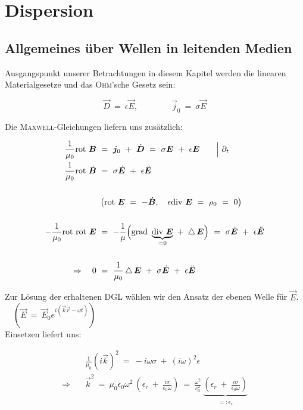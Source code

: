 \chapter{Dispersion}

\section{Allgemeines über Wellen in leitenden Medien}

Ausgangspunkt unserer Betrachtungen in diesem Kapitel werden die linearen Materialgesetze und das \textsc{Ohm}'sche Gesetz sein:

\begin{equation*}
\vec{D}  \ = \ \epsilon \vec{E}, \qquad\qquad\vec{j}_0  \ = \ \sigma\vec{E}
\end{equation*}

Die \textsc{Maxwell}-Gleichungen liefern uns zusätzlich:

\begin{align*}
\frac{1}{\mu_0}\rot\vec{B}  \ &= \  \vec{j}_0 \ + \ \dot{\vec{D}}  \ = \ \sigma\vec{E} \ + \ \epsilon\vec{E} \qquad\Big| \ \partial_t\\
\frac{1}{\mu_0}\rot\dot{\vec{B}} \ &= \ \sigma\dot{\vec{E}} \ + \ \epsilon\ddot{\vec{E}}\\
\ \\
&\left(\rot\vec{E} \ = \ -\dot{\vec{B}}, \quad \epsilon\div\vec{E} \ = \ \rho_0  \ = \ 0\right)\\
\ \\
-\frac{1}{\mu_0} \rot\rot \vec{E}  \ &= \ - \frac{1}{\mu}\Big(\grad\underbrace{\div\vec{E}}_{=0} \ + \ \laplace\vec{E}\Big)  \ = \ \sigma\dot{\vec{E}} \ + \ \epsilon\ddot{\vec{E}}\\
\ \\
\Rightarrow \quad 0  \ &= \ \frac{1}{\mu_0}\laplace\vec{E} \ + \ \sigma\dot{\vec{E}}\ + \ \epsilon\ddot{\vec{E}} 
\end{align*}

Zur Lösung der erhaltenen DGL wählen wir den Ansatz der ebenen Welle für $\vec{E}$. $\quad(\vec{E} \ = \ \vec{E}_0 e^{i(\vec{k}\vec{r}-\omega t)})$\\
\newpage
Einsetzen liefert uns:

\begin{align*}
&\frac{1}{\mu_0} \left(i\vec{k}\right)^2  \ = \ -i \omega \sigma \ + \  \left(i\omega\right)^2\epsilon\\
\Rightarrow\quad &\vec{k}^2 \ = \ \mu_0\epsilon_0\omega^2 \ \left(\epsilon_r \ + \ \frac{i\sigma}{\epsilon_0\omega}\right) \ = \ \frac{\omega^2}{c_0^2} \ \underbrace{\left(\epsilon_r \ + \ \frac{i\sigma}{\epsilon_0 \omega}\right)}_{=:\tilde{\epsilon}_r}
\end{align*}


